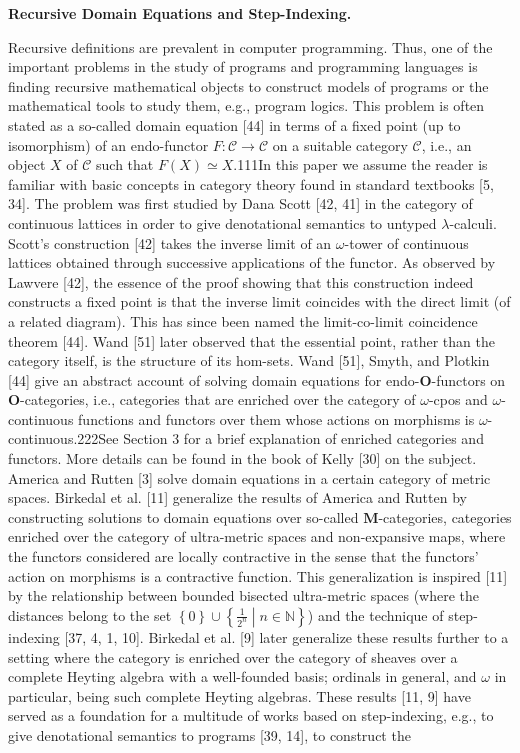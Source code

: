 \documentclass[10pt,a4paper]{article}
\begin{document}
\par\medskip\noindent\textbf{Recursive Domain Equations and Step-Indexing.}\par
 
 
Recursive definitions are prevalent in computer programming. Thus, one of the important problems in the study of programs and programming languages is finding recursive mathematical objects to construct models of programs or the mathematical tools to study them, e.g., program logics. This problem is often stated as a so-called domain equation [44] in terms of a fixed point (up to isomorphism) of an endo-functor $F:\mathcal{C}\to\mathcal{C}$ on a suitable category $\mathcal{C}$, i.e., an object $X$ of $\mathcal{C}$ such that $F(X)\simeq X$.111In this paper we assume the reader is familiar with basic concepts in category theory found in standard textbooks [5, 34]. The problem was first studied by Dana Scott [42, 41] in the category of continuous lattices in order to give denotational semantics to untyped $\lambda$-calculi. Scott’s construction [42] takes the inverse limit of an $\omega$-tower of continuous lattices obtained through successive applications of the functor. As observed by Lawvere [42], the essence of the proof showing that this construction indeed constructs a fixed point is that the inverse limit coincides with the direct limit (of a related diagram). This has since been named the limit-co-limit coincidence theorem [44]. Wand [51] later observed that the essential point, rather than the category itself, is the structure of its hom-sets. Wand [51], Smyth, and Plotkin [44] give an abstract account of solving domain equations for endo-$\mathbf{O}$-functors on $\mathbf{O}$-categories, i.e., categories that are enriched over the category of $\omega$-cpos and $\omega$-continuous functions and functors over them whose actions on morphisms is $\omega$-continuous.222See Section 3 for a brief explanation of enriched categories and functors. More details can be found in the book of Kelly [30] on the subject. America and Rutten [3] solve domain equations in a certain category of metric spaces. Birkedal et al. [11] generalize the results of America and Rutten by constructing solutions to domain equations over so-called $\mathbf{M}$-categories, categories enriched over the category of ultra-metric spaces and non-expansive maps, where the functors considered are locally contractive in the sense that the functors’ action on morphisms is a contractive function. This generalization is inspired [11] by the relationship between bounded bisected ultra-metric spaces (where the distances belong to the set $\left\{0\right\}\cup\left\{\frac{1}{2^{n}}\middle|n\in\mathbb{N}\right\}$) and the technique of step-indexing [37, 4, 1, 10]. Birkedal et al. [9] later generalize these results further to a setting where the category is enriched over the category of sheaves over a complete Heyting algebra with a well-founded basis; ordinals in general, and $\omega$ in particular, being such complete Heyting algebras. These results [11, 9] have served as a foundation for a multitude of works based on step-indexing, e.g., to give denotational semantics to programs [39, 14], to construct the 
\end{document}
